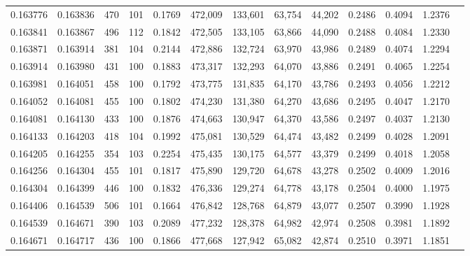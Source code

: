 \begin{tabular}{rrrrrrrrrrrrr}
0.163776 & 0.163836 &   470 & 101 &                                     0.1769 & 472,009 & 133,601 &  63,754 &  44,202 & 0.2486 & 0.4094 & 1.2376 \\
0.163841 & 0.163867 &   496 & 112 &                                     0.1842 & 472,505 & 133,105 &  63,866 &  44,090 & 0.2488 & 0.4084 & 1.2330 \\
0.163871 & 0.163914 &   381 & 104 &                                     0.2144 & 472,886 & 132,724 &  63,970 &  43,986 & 0.2489 & 0.4074 & 1.2294 \\
0.163914 & 0.163980 &   431 & 100 &                                     0.1883 & 473,317 & 132,293 &  64,070 &  43,886 & 0.2491 & 0.4065 & 1.2254 \\
0.163981 & 0.164051 &   458 & 100 &                                     0.1792 & 473,775 & 131,835 &  64,170 &  43,786 & 0.2493 & 0.4056 & 1.2212 \\
0.164052 & 0.164081 &   455 & 100 &                                     0.1802 & 474,230 & 131,380 &  64,270 &  43,686 & 0.2495 & 0.4047 & 1.2170 \\
0.164081 & 0.164130 &   433 & 100 &                                     0.1876 & 474,663 & 130,947 &  64,370 &  43,586 & 0.2497 & 0.4037 & 1.2130 \\
0.164133 & 0.164203 &   418 & 104 &                                     0.1992 & 475,081 & 130,529 &  64,474 &  43,482 & 0.2499 & 0.4028 & 1.2091 \\
0.164205 & 0.164255 &   354 & 103 &                                     0.2254 & 475,435 & 130,175 &  64,577 &  43,379 & 0.2499 & 0.4018 & 1.2058 \\
0.164256 & 0.164304 &   455 & 101 &                                     0.1817 & 475,890 & 129,720 &  64,678 &  43,278 & 0.2502 & 0.4009 & 1.2016 \\
0.164304 & 0.164399 &   446 & 100 &                                     0.1832 & 476,336 & 129,274 &  64,778 &  43,178 & 0.2504 & 0.4000 & 1.1975 \\
0.164406 & 0.164539 &   506 & 101 &                                     0.1664 & 476,842 & 128,768 &  64,879 &  43,077 & 0.2507 & 0.3990 & 1.1928 \\
0.164539 & 0.164671 &   390 & 103 &                                     0.2089 & 477,232 & 128,378 &  64,982 &  42,974 & 0.2508 & 0.3981 & 1.1892 \\
0.164671 & 0.164717 &   436 & 100 &                                     0.1866 & 477,668 & 127,942 &  65,082 &  42,874 & 0.2510 & 0.3971 & 1.1851 \\

\end{tabular}
